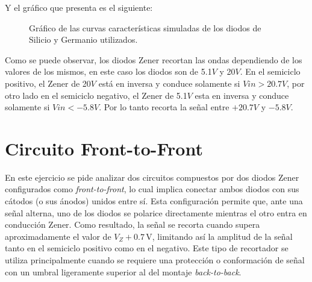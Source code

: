 \documentclass[chaptersright]{informeutn}
\begin{document}
        Y el gráfico que presenta es el siguiente:
        \begin{figure}[!ht]
          \centering
          \caption{Gráfico de las curvas características simuladas de los diodos de Silicio y Germanio utilizados.}
          \label{graph.simulation.recortador.btb}
        \end{figure}

        Como se puede observar, los diodos Zener recortan las ondas dependiendo de los valores de los mismos, en
        este caso los diodos son de 5.1$V$ y 20$V$. En el semiciclo positivo, el Zener de 20$V$ está en inversa y
        conduce solamente si $Vin > 20.7V$, por otro lado en el semiciclo negativo, el Zener de 5.1$V$ esta en
        inversa y conduce solamente si $Vin <-5.8V$. Por lo tanto recorta la señal entre $+20.7V$ y $-5.8V$.

        \section{Circuito Front-to-Front}
          En este ejercicio se pide analizar dos circuitos compuestos por dos diodos Zener configurados como 
          \textit{front-to-front}, lo cual implica conectar ambos diodos con sus cátodos (o sus ánodos) unidos entre
          sí. Esta configuración permite que, ante una señal alterna, uno de los diodos se polarice directamente
          mientras el otro entra en conducción Zener. Como resultado, la señal se recorta cuando supera aproximadamente
          el valor de $V_Z + 0.7\,\text{V}$, limitando así la amplitud de la señal tanto en el semiciclo positivo como
          en el negativo. Este tipo de recortador se utiliza principalmente cuando se requiere una protección o
          conformación de señal con un umbral ligeramente superior al del montaje \textit{back-to-back}.
\end{document}
